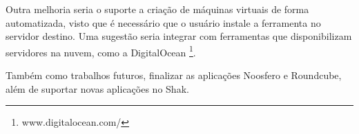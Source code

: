 Outra melhoria seria o suporte a criação de máquinas virtuais de forma automatizada, visto
que é necessário que o usuário instale a ferramenta no servidor destino. Uma sugestão
seria integrar com ferramentas que disponibilizam servidores na nuvem, como a 
DigitalOcean \footnote{www.digitalocean.com/}. 
 
Também como trabalhos futuros, finalizar as aplicações Noosfero e Roundcube, além
de suportar novas aplicações no Shak.
